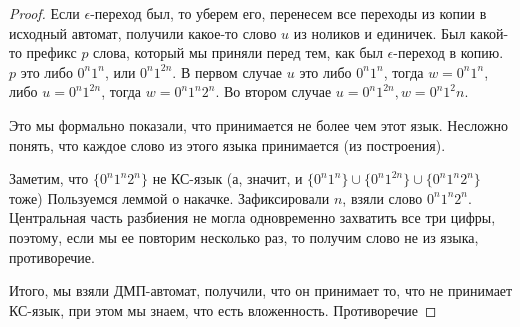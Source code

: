 \begin{proof}
Если $\epsilon$-переход был, то уберем его, перенесем все переходы из копии в исходный автомат, получили какое-то слово $u$ из ноликов и единичек.
Был какой-то префикс $p$ слова, который мы приняли перед тем, как был $\epsilon$-переход в копию.
$p$ это либо $0^n1^n$, или $0^n1^{2n}$. 
В первом случае $u$ это либо $0^n1^n$, тогда $w = 0^n1^n$, либо $u=0^n1^{2n}$, тогда $w = 0^n1^n2^n$.
Во втором случае $u = 0^n1^{2n}, w = 0^n1^2n$. 

Это мы формально показали, что принимается не более чем этот язык. Несложно понять, что каждое слово из этого языка принимается (из построения).

Заметим, что $\{0^n1^n2^n\}$ не КС-язык (а, значит, и $\{0^n1^n\} \cup \{0^n1^{2n}\} \cup \{0^n1^n2^n\}$ тоже)
Пользуемся леммой о накачке. Зафиксировали $n$, взяли слово $0^n1^n2^n$. 
Центральная часть разбиения не могла одновременно захватить все три цифры, поэтому, если мы ее повторим несколько раз, то получим слово не из языка, противоречие.

Итого, мы взяли ДМП-автомат, получили, что он принимает то, что не принимает КС-язык, при этом мы знаем, что есть вложенность.
Противоречие
\end{proof}